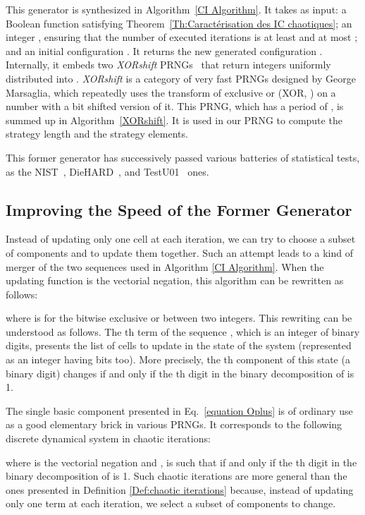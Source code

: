 \documentclass{article}
\begin{document}
This generator is synthesized in Algorithm~\ref{CI Algorithm}.
It takes as input: a Boolean function  satisfying Theorem~\ref{Th:Caractérisation   des   IC   chaotiques};
an integer , ensuring that the number of executed iterations is at least 
and at most ; and an initial configuration .
It returns the new generated configuration .  Internally, it embeds two
\textit{XORshift} PRNGs~\cite{Marsaglia2003} that return integers
uniformly distributed
into .
\textit{XORshift} is a category of very fast PRNGs designed by George Marsaglia,
which repeatedly uses the transform of exclusive or (XOR, ) on a number
with a bit shifted version of it. This PRNG, which has a period of
, is summed up in Algorithm~\ref{XORshift}. It is used
in our PRNG to compute the strategy length and the strategy elements.

This former generator has successively passed various batteries of statistical tests, as the NIST~\cite{bcgr11:ip}, DieHARD~\cite{Marsaglia1996}, and TestU01~\cite{LEcuyerS07} ones.

\subsection{Improving the Speed of the Former Generator}

Instead of updating only one cell at each iteration, we can try to choose a
subset of components and to update them together. Such an attempt leads
to a kind of merger of the two sequences used in Algorithm 
\ref{CI Algorithm}. When the updating function is the vectorial negation,
this algorithm can be rewritten as follows:


where  is for the bitwise exclusive or between two integers. 
This rewriting can be understood as follows. The th term  of the
sequence , which is an integer of  binary digits, presents
the list of cells to update in the state  of the system (represented
as an integer having  bits too). More precisely, the th 
component of this state (a binary digit) changes if and only if the th 
digit in the binary decomposition of  is 1.

The single basic component presented in Eq.~\ref{equation Oplus} is of 
ordinary use as a good elementary brick in various PRNGs. It corresponds
to the following discrete dynamical system in chaotic iterations:


where  is the vectorial negation and , 
 is such that
 if and only if the th digit in the binary
decomposition of  is 1. Such chaotic iterations are more general
than the ones presented in Definition \ref{Def:chaotic iterations} because, instead of updating only one term at each iteration,
we select a subset of components to change.
\end{document}
